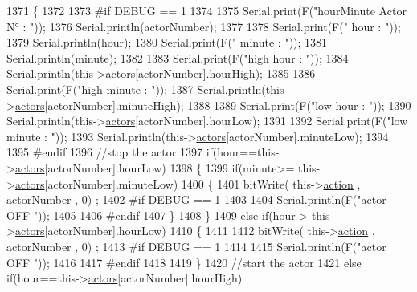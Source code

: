 \begin{DoxyCode}
1371 \{
1372 
1373 \textcolor{preprocessor}{#if DEBUG == 1}
1374 
1375     Serial.print(F(\textcolor{stringliteral}{"hourMinute Actor N° : "}));
1376     Serial.println(actorNumber);
1377 
1378     Serial.print(F(\textcolor{stringliteral}{" hour : "}));
1379     Serial.println(hour);
1380     Serial.print(F(\textcolor{stringliteral}{" minute : "}));
1381     Serial.println(minute);
1382 
1383     Serial.print(F(\textcolor{stringliteral}{"high hour : "}));
1384     Serial.println(this->\hyperlink{class_jetpack_a7e16d2f97837f9712a2e6de1c50d99db}{actors}[actorNumber].hourHigh);
1385 
1386     Serial.print(F(\textcolor{stringliteral}{"high minute : "}));
1387     Serial.println(this->\hyperlink{class_jetpack_a7e16d2f97837f9712a2e6de1c50d99db}{actors}[actorNumber].minuteHigh);
1388 
1389     Serial.print(F(\textcolor{stringliteral}{"low hour : "}));
1390     Serial.println(this->\hyperlink{class_jetpack_a7e16d2f97837f9712a2e6de1c50d99db}{actors}[actorNumber].hourLow);
1391 
1392     Serial.print(F(\textcolor{stringliteral}{"low minute : "}));
1393     Serial.println(this->\hyperlink{class_jetpack_a7e16d2f97837f9712a2e6de1c50d99db}{actors}[actorNumber].minuteLow);
1394 
1395 \textcolor{preprocessor}{#endif}
1396     \textcolor{comment}{//stop the actor}
1397     \textcolor{keywordflow}{if}(hour==this->\hyperlink{class_jetpack_a7e16d2f97837f9712a2e6de1c50d99db}{actors}[actorNumber].hourLow)
1398     \{
1399         \textcolor{keywordflow}{if}(minute>= this->\hyperlink{class_jetpack_a7e16d2f97837f9712a2e6de1c50d99db}{actors}[actorNumber].minuteLow)
1400         \{
1401             bitWrite( this->\hyperlink{class_jetpack_aca3142925a7b0834b34ae91d26af7765}{action} , actorNumber , 0) ;
1402 \textcolor{preprocessor}{        #if DEBUG == 1 }
1403 
1404             Serial.println(F(\textcolor{stringliteral}{"actor OFF "}));
1405 
1406 \textcolor{preprocessor}{        #endif  }
1407         \}
1408     \}
1409     \textcolor{keywordflow}{else} \textcolor{keywordflow}{if}(hour > this->\hyperlink{class_jetpack_a7e16d2f97837f9712a2e6de1c50d99db}{actors}[actorNumber].hourLow)
1410     \{
1411 
1412         bitWrite( this->\hyperlink{class_jetpack_aca3142925a7b0834b34ae91d26af7765}{action} , actorNumber , 0) ;
1413 \textcolor{preprocessor}{    #if DEBUG == 1 }
1414 
1415         Serial.println(F(\textcolor{stringliteral}{"actor OFF "}));
1416 
1417 \textcolor{preprocessor}{    #endif  }
1418     
1419     \}
1420     \textcolor{comment}{//start the actor}
1421     \textcolor{keywordflow}{else} \textcolor{keywordflow}{if}(hour==this->\hyperlink{class_jetpack_a7e16d2f97837f9712a2e6de1c50d99db}{actors}[actorNumber].hourHigh)

\end{DoxyCode}
